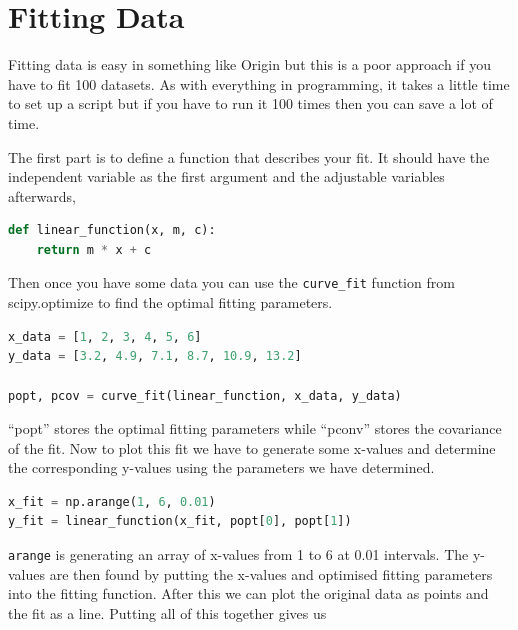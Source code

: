 \section{Fitting Data}
	Fitting data is easy in something like Origin but this is a poor approach if you have to fit 100 datasets. As with everything in programming, it takes a little time to set up a script but if you have to run it 100 times then you can save a lot of time.

The first part is to define a function that describes your fit. It should have the independent variable as the first argument and the adjustable variables afterwards,
\begin{lstlisting}[language=Python]
def linear_function(x, m, c):
	return m * x + c
\end{lstlisting}

Then once you have some data you can use the \texttt{curve\_fit} function from scipy.optimize to find the optimal fitting parameters.
\begin{lstlisting}[language=Python]
x_data = [1, 2, 3, 4, 5, 6]
y_data = [3.2, 4.9, 7.1, 8.7, 10.9, 13.2]

popt, pcov = curve_fit(linear_function, x_data, y_data)
\end{lstlisting}
``popt'' stores the optimal fitting parameters while ``pconv'' stores the covariance of the fit.
Now to plot this fit we have to generate some x-values and determine the corresponding y-values using the parameters we have determined.
\begin{lstlisting}[language=Python]
x_fit = np.arange(1, 6, 0.01)
y_fit = linear_function(x_fit, popt[0], popt[1])
\end{lstlisting}
\texttt{arange} is generating an array of x-values from 1 to 6 at 0.01 intervals. The y-values are then found by putting the x-values and optimised fitting parameters into the fitting function. After this we can plot the original data as points and the fit as a line. Putting all of this together gives us

